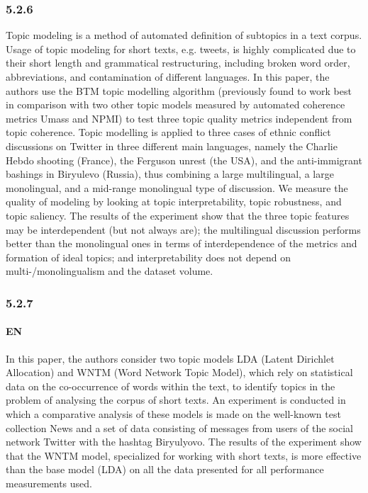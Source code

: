 \subsubsection{5.2.6}

Topic modeling is a method of automated definition of subtopics in a text corpus. Usage of topic modeling for short texts, e.g. tweets, is highly complicated due to their short length and grammatical restructuring, including broken word order, abbreviations, and contamination of different languages. In this paper, the authors use the BTM topic modelling algorithm (previously found to work best in comparison with two other topic models measured by automated coherence metrics Umass and NPMI) to test three topic quality metrics independent from topic coherence. Topic modelling is applied to three cases of ethnic conflict discussions on Twitter in three different main languages, namely the Charlie Hebdo shooting (France), the Ferguson unrest (the USA), and the anti-immigrant bashings in Biryulevo (Russia), thus combining a large multilingual, a large monolingual, and a mid-range monolingual type of discussion. We measure the quality of modeling by looking at topic interpretability, topic robustness, and topic saliency. The results of the experiment show that the three topic features may be interdependent (but not always are); the multilingual discussion performs better than the monolingual ones in terms of interdependence of the metrics and formation of ideal topics; and interpretability does not depend on multi-/monolingualism and the dataset volume.

\subsubsection{5.2.7}

\paragraph{EN} In this paper, the authors consider two topic models LDA (Latent Dirichlet Allocation) and WNTM (Word Network Topic Model), which rely on statistical data on the co-occurrence of words within the text, to identify topics in the problem of analysing the corpus of short texts. An experiment is conducted in which a comparative analysis of these models is made on the well-known test collection News and a set of data consisting of messages from users of the social network Twitter with the hashtag Biryulyovo. The results of the experiment show that the WNTM model, specialized for working with short texts, is more effective than the base model (LDA) on all the data presented for all performance measurements used.

